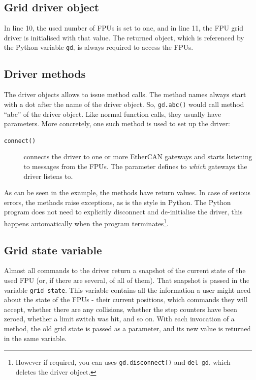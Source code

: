\documentclass{scrartcl}[12pt,a4paper]
\begin{document}
\subsection{Grid driver object}

In line 10, the used number of FPUs is set to one, and in line 11, the
FPU grid driver is initialised with that value. The returned object,
which is referenced by the Python variable \texttt{gd}, is always
required to access the FPUs.

\subsection{Driver methods}

The driver objects allows to issue method calls. The method names
always start with a dot after the name of the driver object.  So,
\texttt{gd.abc()} would call method ``abc'' of the driver object. Like
normal function calls, they usually have parameters. More concretely,
one such method is used to set up the driver:

\begin{description}
\item[\texttt{connect()}] connects the driver to one or more EtherCAN
  gateways and starts listening to messages from the FPUs. The
  parameter defines to \emph{which} gateways the driver listens to.

\end{description}

As can be seen in the example, the methods have return values.  In
case of serious errors, the methods raise exceptions, as is the style
in Python. The Python program does not need to explicitly disconnect
and de-initialise the driver, this happens automatically
when the program terminates\footnote{However if required, you can uses
  \texttt{gd.disconnect()} and \texttt{del gd}, which deletes the driver object.}.



\subsection{Grid state variable}

Almost all commands to the driver return a snapshot of the current
state of the used FPU (or, if there are several, of all of them). That
snapshot is passed in the variable \texttt{grid\_state}. This variable
contains all the information a user might need about the state of the
FPUs - their current positions, which commands they will accept,
whether there are any collisions, whether the step counters have been
zeroed, whether a limit switch was hit, and so on. With each
invocation of a method, the old grid state is passed as a parameter,
and its new value is returned in the same variable.
\end{document}
